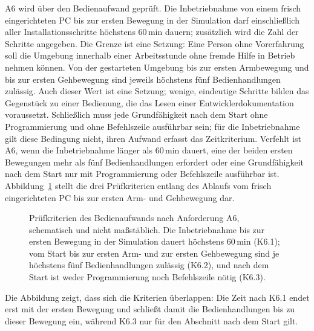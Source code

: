 A6 wird über den Bedienaufwand geprüft.
Die Inbetriebnahme von einem frisch eingerichteten PC bis zur ersten Bewegung in der Simulation darf einschließlich aller Installationsschritte höchstens 60\,min dauern; zusätzlich wird die Zahl der Schritte angegeben. %
Die Grenze ist eine Setzung: Eine Person ohne Vorerfahrung soll die Umgebung innerhalb einer Arbeitsstunde ohne fremde Hilfe in Betrieb nehmen können.
Von der gestarteten Umgebung bis zur ersten Armbewegung und bis zur ersten Gehbewegung sind jeweils höchstens fünf Bedienhandlungen zulässig. %
Auch dieser Wert ist eine Setzung; wenige, eindeutige Schritte bilden das Gegenstück zu einer Bedienung, die das Lesen einer Entwicklerdokumentation voraussetzt.
Schließlich muss jede Grundfähigkeit nach dem Start ohne Programmierung und ohne Befehlszeile ausführbar sein; für die Inbetriebnahme gilt diese Bedingung nicht, ihren Aufwand erfasst das Zeitkriterium. %
Verfehlt ist A6, wenn die Inbetriebnahme länger als 60\,min dauert, eine der beiden ersten Bewegungen mehr als fünf Bedienhandlungen erfordert oder eine Grundfähigkeit nach dem Start nur mit Programmierung oder Befehlszeile ausführbar ist.
Abbildung~\ref{fig:inbetriebnahme} stellt die drei Prüfkriterien entlang des Ablaufs vom frisch eingerichteten PC bis zur ersten Arm- und Gehbewegung dar.

\begin{figure}[htbp]
  \centering
  
  \caption[Prüfkriterien des Bedienaufwands nach Anforderung A6]{Prüfkriterien des Bedienaufwands nach Anforderung A6, schematisch und nicht maßstäblich. Die Inbetriebnahme bis zur ersten Bewegung in der Simulation dauert höchstens 60\,min (K6.1); vom Start bis zur ersten Arm- und zur ersten Gehbewegung sind je höchstens fünf Bedienhandlungen zulässig (K6.2), und nach dem Start ist weder Programmierung noch Befehlszeile nötig (K6.3).}
  \label{fig:inbetriebnahme}
\end{figure}

Die Abbildung zeigt, dass sich die Kriterien überlappen: Die Zeit nach K6.1 endet erst mit der ersten Bewegung und schließt damit die Bedienhandlungen bis zu dieser Bewegung ein, während K6.3 nur für den Abschnitt nach dem Start gilt.

